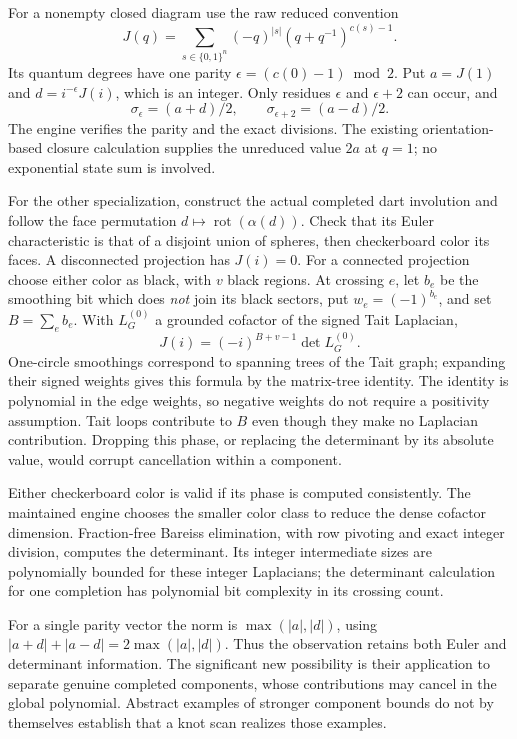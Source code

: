For a nonempty closed diagram use the raw reduced convention
\[
 J(q)=\sum_{s\in\{0,1\}^n}(-q)^{|s|}
             (q+q^{-1})^{c(s)-1}.
\]
Its quantum degrees have one parity
$\epsilon=(c(0)-1)\bmod2$.  Put $a=J(1)$ and
$d=i^{-\epsilon}J(i)$, which is an integer.  Only residues $\epsilon$
and $\epsilon+2$ can occur, and
\[
 \sigma_\epsilon=(a+d)/2,\qquad
 \sigma_{\epsilon+2}=(a-d)/2.
\]
The engine verifies the parity and the exact divisions.  The existing
orientation-based closure calculation supplies the unreduced value
$2a$ at $q=1$; no exponential state sum is involved.

For the other specialization, construct the actual completed dart
involution and follow the face permutation
$d\mapsto\operatorname{rot}(\alpha(d))$.  Check that its Euler
characteristic is that of a disjoint union of spheres, then checkerboard
color its faces.  A disconnected projection has $J(i)=0$.
For a connected projection choose either color as black, with $v$ black
regions.  At crossing $e$, let $b_e$ be the smoothing bit which does
\emph{not} join its black sectors, put $w_e=(-1)^{b_e}$, and set
$B=\sum_e b_e$.  With $L_G^{(0)}$ a grounded cofactor of the signed
Tait Laplacian,
\[
                  J(i)=(-i)^{B+v-1}\det L_G^{(0)}.
\]
One-circle smoothings correspond to spanning trees of the Tait graph;
expanding their signed weights gives this formula by the matrix-tree
identity.  The identity is polynomial in the edge weights, so negative
weights do not require a positivity assumption.  Tait loops contribute
to $B$ even though they make no Laplacian contribution.  Dropping this
phase, or replacing the determinant by its absolute value, would corrupt
cancellation within a component.

Either checkerboard color is valid if its phase is computed consistently.
The maintained engine chooses the smaller color class to reduce the
dense cofactor dimension.  Fraction-free Bareiss elimination, with row
pivoting and exact integer division, computes the determinant.  Its
integer intermediate sizes are polynomially bounded for these
integer Laplacians; the determinant calculation for one completion has
polynomial bit complexity in its crossing count.

For a single parity vector the norm is
$\max(|a|,|d|)$, using
$|a+d|+|a-d|=2\max(|a|,|d|)$.  Thus the observation retains both Euler
and determinant information.  The significant new possibility is their
application to separate genuine completed components, whose contributions
may cancel in the global polynomial.  Abstract examples of stronger
component bounds do not by themselves establish that a knot scan realizes
those examples.

